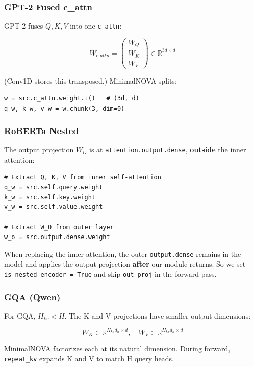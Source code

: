 \subsubsection{GPT-2 Fused c\_attn}

GPT-2 fuses $Q, K, V$ into one \texttt{c\_attn}:

\[
W_{c\_attn} = \begin{pmatrix} W_Q \\ W_K \\ W_V \end{pmatrix} \in \mathbb{R}^{3d \times d}
\tag{4.6}
\]

(Conv1D stores this transposed.) MinimalNOVA splits:

\begin{lstlisting}
w = src.c_attn.weight.t()   # (3d, d)
q_w, k_w, v_w = w.chunk(3, dim=0)
\end{lstlisting}

\subsubsection{RoBERTa Nested}

The output projection $W_O$ is at \texttt{attention.output.dense}, \textbf{outside} the 
inner attention:

\begin{lstlisting}
# Extract Q, K, V from inner self-attention
q_w = src.self.query.weight
k_w = src.self.key.weight
v_w = src.self.value.weight

# Extract W_O from outer layer
w_o = src.output.dense.weight
\end{lstlisting}

When replacing the inner attention, the outer \texttt{output.dense} remains in 
the model and applies the output projection \textbf{after} our module returns. 
So we set \texttt{is\_nested\_encoder = True} and skip \texttt{out\_proj} in the forward 
pass.

\subsubsection{GQA (Qwen)}

For GQA, $H_{kv} < H$. The K and V projections have smaller output 
dimensions:

\[
W_K \in \mathbb{R}^{H_{kv} d_h \times d}, \quad
W_V \in \mathbb{R}^{H_{kv} d_h \times d}
\tag{4.7}
\]

MinimalNOVA factorizes each at its natural dimension. During forward, 
\texttt{repeat\_kv} expands K and V to match H query heads.

